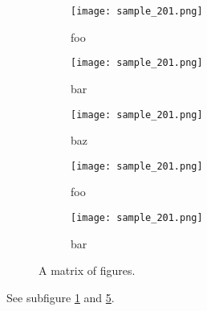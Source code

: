 \documentclass{article}
\begin{document}
\begin{figure}[h]
    \centering
    \begin{subfigure}{0.45\textwidth}
        \texttt{[image: sample\_201.png]}
        \caption{foo}
        \label{fig:sub1}
    \end{subfigure}
    \hfill
    \begin{subfigure}{0.45\textwidth}
        \texttt{[image: sample\_201.png]}
        \caption{bar}
        \label{fig:sub2}
    \end{subfigure}
    
    \begin{subfigure}{0.45\textwidth}
        \texttt{[image: sample\_201.png]}
        \caption{baz}
        \label{fig:sub3}
    \end{subfigure}
    \hfill
    \begin{subfigure}{0.45\textwidth}
        \texttt{[image: sample\_201.png]}
        \caption{foo}
        \label{fig:sub4}
    \end{subfigure}
    \hfill
    \begin{subfigure}{0.45\textwidth}
        \texttt{[image: sample\_201.png]}
        \caption{bar}
        \label{fig:sub5}
    \end{subfigure}
    
    \caption{A matrix of figures.}
    \label{fig:matrix}
\end{figure}

See subfigure \ref{fig:sub1} and \ref{fig:sub5}.
\end{document}
